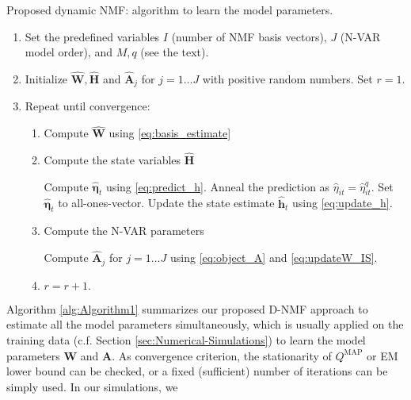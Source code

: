 \documentclass[10pt,twocolumn,twoside] {IEEEtran}
\begin{document}
\begin{algorithm}[t]
\caption{\label{alg:Algorithm1} Proposed dynamic NMF: algorithm to learn the model parameters.}
{\small
\begin{enumerate}
  \item Set the predefined variables $I$ (number of NMF basis vectors), $J$ (N-VAR model order), and $M,q$ (see the text).
  \item Initialize $\hat{\mathbf{W}},\hat{\mathbf{H}}$ and $\hat{\mathbf{A}}_j$ for $j=1 \ldots J$ with positive random numbers. Set $r=1$.
  \item Repeat until convergence:
  \begin{enumerate}
    \item Compute $\hat{\mathbf{W}}$  using \eqref{eq:basis_estimate}
    \item Compute the state variables $\hat{\mathbf{H}}$
\begin{algorithmic}[0]

    \STATE Compute $\hat{\boldsymbol{\eta}}_{t}$ using \eqref{eq:predict_h}.
    \STATE Anneal the prediction as $\hat{\eta}_{it}=\hat{\eta}_{it}^q$.
    \ELSE
    \STATE Set $\hat{\boldsymbol{\eta}}_{t}$ to all-ones-vector.
    \ENDIF
    \STATE Update the state estimate $\hat{\mathbf{h}}_{t}$ using \eqref{eq:update_h}.
\ENDFOR
\end{algorithmic}
\item Compute the N-VAR parameters
\begin{algorithmic}[0]
\STATE Compute $\hat{\mathbf{A}}_j$ for $j=1 \ldots J$ using \eqref{eq:object_A} and \eqref{eq:updateW_IS}.
\ENDIF
\end{algorithmic}
\item $r=r+1.$
  \end{enumerate}
  \end{enumerate}
  }
\end{algorithm}
Algorithm \ref{alg:Algorithm1} summarizes our proposed D-NMF approach to estimate all the model parameters
simultaneously, which is usually applied on the training data (c.f. Section \ref{sec:Numerical-Simulations}) to learn the model parameters  $\mathbf{W}$ and $\mathbf{A}$. As convergence criterion, the stationarity of $Q^{\text{MAP}}$ or EM lower bound can be checked, or a fixed (sufficient) number of iterations can be simply used. In our simulations, we
\end{document}
